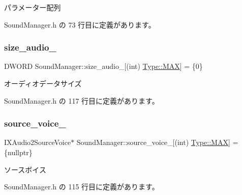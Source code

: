 パラメーター配列 



 Sound\+Manager.\+h の 73 行目に定義があります。

\mbox{\label{class_sound_manager_aa95190cc70cca6b516bed20f22f2f0ba}} 
\subsubsection{\texorpdfstring{size\+\_\+audio\+\_\+}{size\_audio\_}}
{\footnotesize\ttfamily D\+W\+O\+RD Sound\+Manager\+::size\+\_\+audio\+\_\+\mbox{[}(int) \mbox{\hyperlink{class_sound_manager_a0b81fc2281f062cd6489ab281fc3be1da26a4b44a837bf97b972628509912b4a5}{Type\+::\+M\+AX}}\mbox{]} = \{0\}\hspace{0.3cm}{\ttfamily [private]}}



オーディオデータサイズ 



 Sound\+Manager.\+h の 117 行目に定義があります。

\mbox{\label{class_sound_manager_a48fc88576a4066e7739138a3c4a0cd47}} 
\subsubsection{\texorpdfstring{source\+\_\+voice\+\_\+}{source\_voice\_}}
{\footnotesize\ttfamily I\+X\+Audio2\+Source\+Voice$\ast$ Sound\+Manager\+::source\+\_\+voice\+\_\+\mbox{[}(int) \mbox{\hyperlink{class_sound_manager_a0b81fc2281f062cd6489ab281fc3be1da26a4b44a837bf97b972628509912b4a5}{Type\+::\+M\+AX}}\mbox{]} = \{nullptr\}\hspace{0.3cm}{\ttfamily [private]}}



ソースボイス 



 Sound\+Manager.\+h の 115 行目に定義があります。

\mbox{\label{class_sound_manager_a61e40cffb2fea01e0840134e10bd8e69}} 

